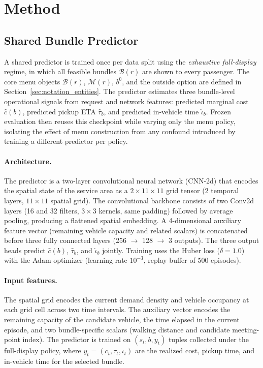 \section{Method}

\subsection{Shared Bundle Predictor}
\label{sec:predictor}

A shared predictor is trained once per data split using the \emph{exhaustive full-display} regime, in which all feasible bundles $\mathcal{B}(r)$ are shown to every passenger. The core menu objects $\mathcal{B}(r)$, $\mathcal{M}(r)$, $b^0$, and the outside option are defined in Section~\ref{sec:notation_entities}. The predictor estimates three bundle-level operational signals from request and network features: predicted marginal cost $\hat{c}(b)$, predicted pickup ETA $\hat{\tau}_b$, and predicted in-vehicle time $\hat{\iota}_b$. Frozen evaluation then reuses this checkpoint while varying only the menu policy, isolating the effect of menu construction from any confound introduced by training a different predictor per policy.

\paragraph{Architecture.} The predictor is a two-layer convolutional neural network (CNN-2d) that encodes the spatial state of the service area as a $2 \times 11 \times 11$ grid tensor (2 temporal layers, $11 \times 11$ spatial grid). The convolutional backbone consists of two Conv2d layers (16 and 32 filters, $3 \times 3$ kernels, same padding) followed by average pooling, producing a flattened spatial embedding. A 4-dimensional auxiliary feature vector (remaining vehicle capacity and related scalars) is concatenated before three fully connected layers (256 $\to$ 128 $\to$ 3 outputs). The three output heads predict $\hat{c}(b)$, $\hat{\tau}_b$, and $\hat{\iota}_b$ jointly. Training uses the Huber loss ($\delta = 1.0$) with the Adam optimizer (learning rate $10^{-3}$, replay buffer of 500 episodes).

\paragraph{Input features.} The spatial grid encodes the current demand density and vehicle occupancy at each grid cell across two time intervals. The auxiliary vector encodes the remaining capacity of the candidate vehicle, the time elapsed in the current episode, and two bundle-specific scalars (walking distance and candidate meeting-point index). The predictor is trained on $(s_t, b, y_t)$ tuples collected under the full-display policy, where $y_t = (c_t, \tau_t, \iota_t)$ are the realized cost, pickup time, and in-vehicle time for the selected bundle.


